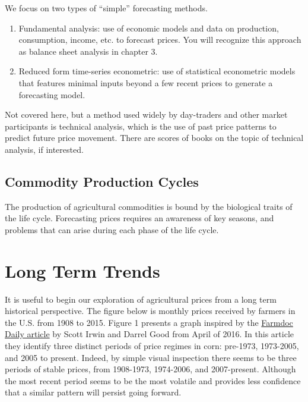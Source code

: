 \documentclass[
  letterpaper,
  DIV=11,
  numbers=noendperiod]{scrreprt}
\begin{document}
We focus on two types of ``simple'' forecasting methods.

\begin{enumerate}
\def\labelenumi{\arabic{enumi}.}
\item
  Fundamental analysis: use of economic models and data on production,
  consumption, income, etc. to forecast prices. You will recognize this
  approach as balance sheet analysis in chapter 3.
\item
  Reduced form time-series econometric: use of statistical econometric
  models that features minimal inputs beyond a few recent prices to
  generate a forecasting model.
\end{enumerate}

Not covered here, but a method used widely by day-traders and other
market participants is technical analysis, which is the use of past
price patterns to predict future price movement. There are scores of
books on the topic of technical analysis, if interested.

\hypertarget{commodity-production-cycles}{%
\subsection{Commodity Production
Cycles}\label{commodity-production-cycles}}

The production of agricultural commodities is bound by the biological
traits of the life cycle. Forecasting prices requires an awareness of
key seasons, and problems that can arise during each phase of the life
cycle.

\hypertarget{long-term-trends}{%
\section{Long Term Trends}\label{long-term-trends}}

It is useful to begin our exploration of agricultural prices from a long
term historical perspective. The figure below is monthly prices received
by farmers in the U.S. from 1908 to 2015. Figure 1 presents a graph
inspired by the
\href{http://farmdocdaily.illinois.edu/2016/04/new-era-of-corn-and-soybean-prices.html}{Farmdoc
Daily article} by Scott Irwin and Darrel Good from April of 2016. In
this article they identify three distinct periods of price regimes in
corn: pre-1973, 1973-2005, and 2005 to present. Indeed, by simple visual
inspection there seems to be three periods of stable prices, from
1908-1973, 1974-2006, and 2007-present. Although the most recent period
seems to be the most volatile and provides less confidence that a
similar pattern will persist going forward.
\end{document}
